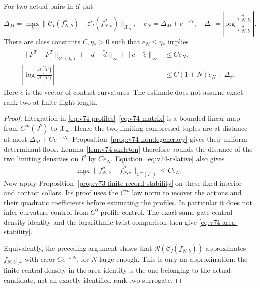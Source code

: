\begin{proposition}
\label{prop:v74-finite-stability}
For two actual pairs in $\mathscr U$ put
\[
 \Delta_M=\max_b\|\mathcal C_I(f_{N,b}^{\vartheta})-
                   \mathcal C_I(f_{N,b}^{\widetilde\vartheta})\|_{\mathcal X_m},
 \quad e_N=\Delta_M+e^{-\omega N},
 \quad\Delta_\pi=\left|\log
     \frac{\pi_{N,b_0}^{\widetilde\vartheta}}{\pi_{N,b_0}^{\vartheta}}\right|.
\]
There are class constants $C,\eta_*>0$ such that $e_N\le\eta_*$
implies
\begin{align}
 \|F^T-F^{\widetilde T}\|_{C^0(I_c)}
  +\|d-\widetilde d\|_\infty+\|c-\widetilde c\|_\infty
                &\le Ce_N,\label{eq:v74-profile-stability}\\
 \left|\log\frac{\mathcal A(\widetilde T)}{\mathcal A(T)}\right|
                &\le C(1+N)e_N+\Delta_\pi.
                \label{eq:v74-area-stability}
\end{align}
Here $c$ is the vector of contact curvatures.  The estimate does not
assume exact rank two at finite flight length.
\end{proposition}
\begin{proof}
Integration in \eqref{eq:v74-profiles}--\eqref{eq:v74-matrix} is a
bounded linear map from $C^m(J^2)$ to $\mathcal X_m$.  Hence the two
limiting compressed tuples are at distance at most
$\Delta_M+Ce^{-\omega N}$.  Proposition~\ref{prop:v74-nondegeneracy}
gives their uniform determinant floor.  Lemma~\ref{lem:v74-skeleton}
therefore bounds the distance of the two limiting densities on $I^2$
by $Ce_N$.  Equation~\eqref{eq:v74-relative} also gives
\begin{equation}\label{eq:v74-finite-density-control}
 \max_b\|f_{N,b}^{\vartheta}-f_{N,b}^{\widetilde\vartheta}
                                             \|_{C^m(I^2)}\le Ce_N.
\end{equation}
Now apply Proposition~\ref{prop:v73-finite-record-stability} on
these fixed interior and contact collars.  Its proof uses the
$C^m$ law norm to recover the actions and their quadratic coefficients
before estimating the profiles.  In particular it does not infer
curvature control from $C^0$ profile control.  The exact same-gate
central-density identity and the logarithmic twist comparison then give
\eqref{eq:v74-area-stability}.

Equivalently, the preceding argument shows that
$\mathcal R(\mathcal C_I(f_{N,b}))$ approximates $f_{N,b}|_{I^2}$
with error $Ce^{-\omega N}$, for $N$ large enough.  This is only an
approximation: the finite central density in the area identity is the
one belonging to the actual candidate, not an exactly identified
rank-two surrogate.
\end{proof}

